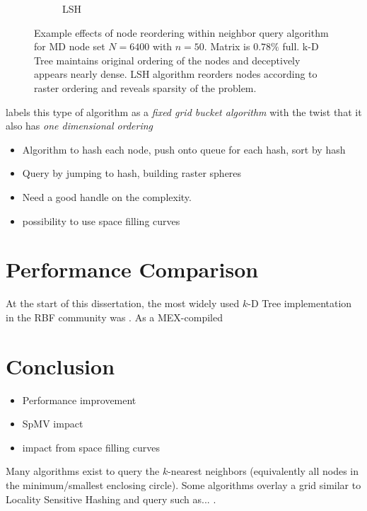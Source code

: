 \documentclass{report}
\begin{document}
\begin{figure}
\begin{subfigure}{0.425\textwidth}
\caption{LSH}
\end{subfigure}
\caption{Example effects of node reordering within neighbor query algorithm for MD node set $N=6400$ with $n=50$. Matrix is $0.78\%$ full. k-D Tree maintains original ordering of the nodes and deceptively appears nearly dense. LSH algorithm reorders nodes according to raster ordering and reveals sparsity of the problem.  }
\end{figure} 

\cite{Samet2005} labels this type of algorithm as a \emph{fixed grid bucket algorithm} with the twist that it also has \emph{one dimensional ordering}
\begin{itemize} 
\item Algorithm to hash each node, push onto queue for each hash, sort by hash
\item Query by jumping to hash, building raster spheres
\item Need a good handle on the complexity. 
\item possibility to use space filling curves
\end{itemize}





\section{Performance Comparison}


At the start of this dissertation, the most widely used $k$-D Tree implementation in the RBF community was \cite{TagliasacchiMFE}. As a MEX-compiled 



\section{Conclusion}
\begin{itemize}
\item Performance improvement
\item SpMV impact
\item impact from space filling curves
\end{itemize}





Many algorithms exist to query the $k$-nearest neighbors (equivalently all nodes in the minimum/smallest enclosing circle). Some algorithms overlay a grid similar to Locality Sensitive Hashing and query such as... \cite{HarPeledMazumdar2003}.
\end{document}
